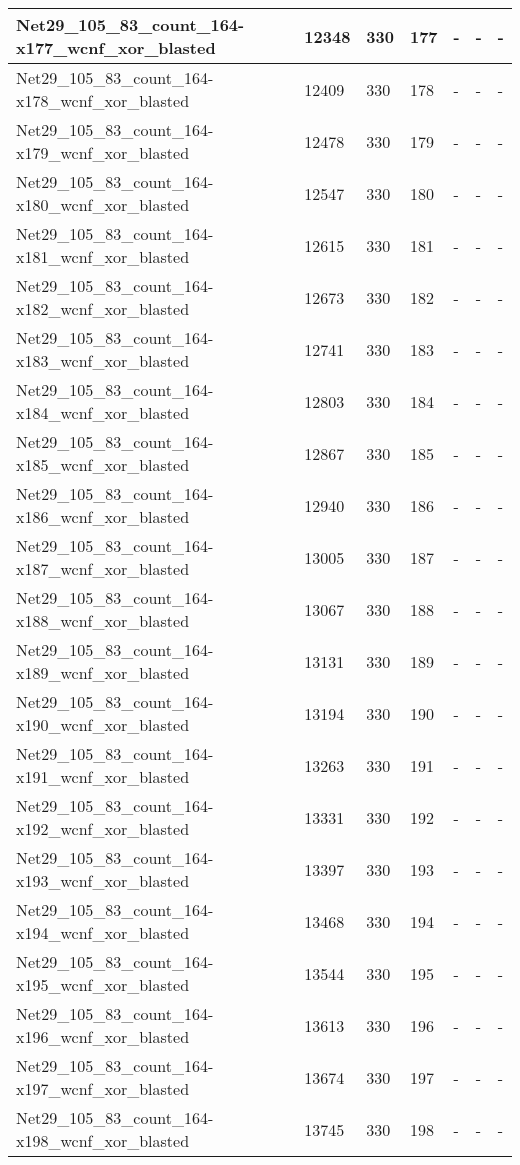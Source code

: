\begin{scriptsize}
\begin{longtable}{|p{5cm}|l|l|l|l|l|l|}
Net29\_105\_83\_count\_164-x177\_wcnf\_xor\_blasted&12348&330&177&-&-&- \\ \hline 
Net29\_105\_83\_count\_164-x178\_wcnf\_xor\_blasted&12409&330&178&-&-&- \\ \hline 
Net29\_105\_83\_count\_164-x179\_wcnf\_xor\_blasted&12478&330&179&-&-&- \\ \hline 
Net29\_105\_83\_count\_164-x180\_wcnf\_xor\_blasted&12547&330&180&-&-&- \\ \hline 
Net29\_105\_83\_count\_164-x181\_wcnf\_xor\_blasted&12615&330&181&-&-&- \\ \hline 
Net29\_105\_83\_count\_164-x182\_wcnf\_xor\_blasted&12673&330&182&-&-&- \\ \hline 
Net29\_105\_83\_count\_164-x183\_wcnf\_xor\_blasted&12741&330&183&-&-&- \\ \hline 
Net29\_105\_83\_count\_164-x184\_wcnf\_xor\_blasted&12803&330&184&-&-&- \\ \hline 
Net29\_105\_83\_count\_164-x185\_wcnf\_xor\_blasted&12867&330&185&-&-&- \\ \hline 
Net29\_105\_83\_count\_164-x186\_wcnf\_xor\_blasted&12940&330&186&-&-&- \\ \hline 
Net29\_105\_83\_count\_164-x187\_wcnf\_xor\_blasted&13005&330&187&-&-&- \\ \hline 
Net29\_105\_83\_count\_164-x188\_wcnf\_xor\_blasted&13067&330&188&-&-&- \\ \hline 
Net29\_105\_83\_count\_164-x189\_wcnf\_xor\_blasted&13131&330&189&-&-&- \\ \hline 
Net29\_105\_83\_count\_164-x190\_wcnf\_xor\_blasted&13194&330&190&-&-&- \\ \hline 
Net29\_105\_83\_count\_164-x191\_wcnf\_xor\_blasted&13263&330&191&-&-&- \\ \hline 
Net29\_105\_83\_count\_164-x192\_wcnf\_xor\_blasted&13331&330&192&-&-&- \\ \hline 
Net29\_105\_83\_count\_164-x193\_wcnf\_xor\_blasted&13397&330&193&-&-&- \\ \hline 
Net29\_105\_83\_count\_164-x194\_wcnf\_xor\_blasted&13468&330&194&-&-&- \\ \hline 
Net29\_105\_83\_count\_164-x195\_wcnf\_xor\_blasted&13544&330&195&-&-&- \\ \hline 
Net29\_105\_83\_count\_164-x196\_wcnf\_xor\_blasted&13613&330&196&-&-&- \\ \hline 
Net29\_105\_83\_count\_164-x197\_wcnf\_xor\_blasted&13674&330&197&-&-&- \\ \hline 
Net29\_105\_83\_count\_164-x198\_wcnf\_xor\_blasted&13745&330&198&-&-&- \\ \hline 

\end{longtable}
\end{scriptsize}
